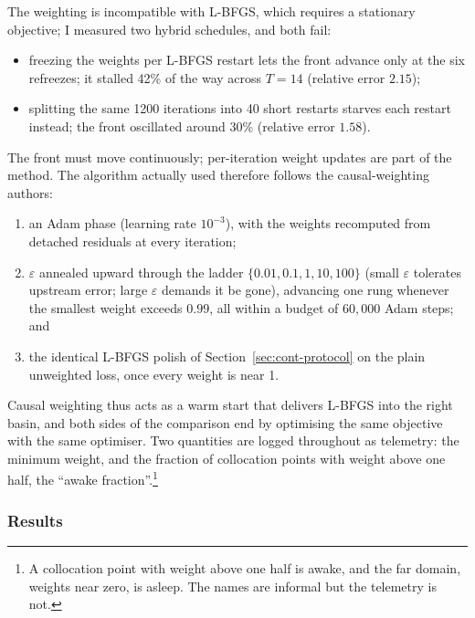 \documentclass[11pt,a4paper]{article}
\begin{document}
The weighting is incompatible with L-BFGS, which requires a stationary
objective; I measured two hybrid schedules, and both fail:
\begin{itemize}
  \item freezing the weights per L-BFGS restart lets the front advance
  only at the six refreezes; it stalled 42\% of the way across $T = 14$
  (relative error $2.15$);
  \item splitting the same 1200 iterations into 40 short restarts starves
  each restart instead; the front oscillated around 30\% (relative error
  $1.58$).
\end{itemize}
The front must move continuously; per-iteration weight updates are part of
the method. The algorithm actually used therefore follows the
causal-weighting authors:
\begin{enumerate}
  \item an Adam phase (learning rate $10^{-3}$), with the weights
  recomputed from detached residuals at every iteration;
  \item $\varepsilon$ annealed upward through the ladder
  $\{0.01, 0.1, 1, 10, 100\}$ (small $\varepsilon$ tolerates upstream
  error; large $\varepsilon$ demands it be gone), advancing one rung
  whenever the smallest weight exceeds $0.99$, all within a budget of
  $60{,}000$ Adam steps; and
  \item the identical L-BFGS polish of Section~\ref{sec:cont-protocol} on
  the plain unweighted loss, once every weight is near 1.
\end{enumerate}
Causal weighting thus acts as a warm start that delivers L-BFGS into the
right basin, and both sides of the comparison end by optimising the same
objective with the same optimiser. Two quantities are logged throughout as
telemetry: the minimum weight, and the fraction of collocation points with
weight above one half, the ``awake fraction''.\footnote{A collocation
point with weight above one half is awake, and the far domain, weights
near zero, is asleep. The names are informal but the telemetry is not.}

\subsubsection{Results}
\end{document}
